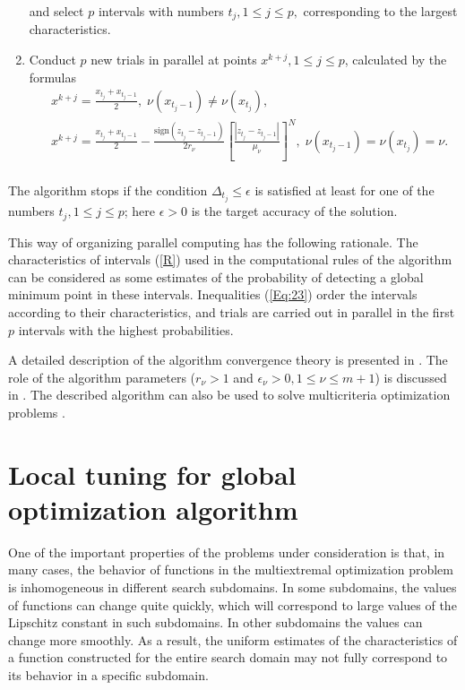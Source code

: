 \documentclass[
11pt,%
tightenlines,%
twoside,%
onecolumn,%
nofloats,%
nobibnotes,%
nofootinbib,%
superscriptaddress,%
noshowpacs,%
centertags]%
{revtex4}
\begin{document}
\begin{enumerate}
and select $p$ intervals with numbers $t_j, 1\leq j \leq p,$ corresponding to the largest characteristics.
\item
Conduct $p$ new trials in parallel at points $x^{k+j}, 1 \leq j \leq p$, calculated by the formulas
\begin{eqnarray*}
& x^{k+j}=\frac{x_{t_j}+x_{t_j-1}}{2}, \; \nu(x_{t_j-1})\neq \nu(x_{t_j}), \\
& x^{k+j}=\frac{x_{t_j}+x_{t_j-1}}{2}- \frac{\mathrm{sign}(z_{t_j}-z_{t_j-1})}{2r_\nu}\left[\frac{\left|z_{t_j}-z_{t_j-1}\right|}{\mu_\nu}\right]^N, \; \nu(x_{t_j-1})=\nu(x_{t_j})=\nu. \\
\end{eqnarray*} 

\end{enumerate}

The algorithm stops if the condition $\Delta_{t_j}\leq \epsilon$ is satisfied at least for one of the numbers $t_j, 1\leq j \leq p$; here $\epsilon>0$ is the target accuracy of the solution.

This way of organizing parallel computing has the following rationale. The characteristics of intervals (\ref{R}) used in the computational rules of the algorithm can be considered as some estimates of the probability of detecting a global minimum point in these intervals. Inequalities (\ref{Eq:23}) order the intervals according to their characteristics, and trials are carried out in parallel in the first $p$ intervals with the highest probabilities.

A detailed description of the algorithm convergence theory is presented in \cite{Strongin2000,Strongin2013}.
The role of the algorithm parameters ($r_\nu>1$ and $\epsilon_\nu>0, 1\leq\nu\leq m+1$) is discussed in \cite{Strongin2020}.
The described algorithm can also be used to solve multicriteria optimization problems \cite{Gergel2020}.

\section{Local tuning for global optimization algorithm}

One of the important properties of the problems under consideration is that, in many cases, the behavior of functions in the multiextremal optimization problem is inhomogeneous in different search subdomains. In some subdomains, the values of functions can change quite quickly, which will correspond to large values of the Lipschitz constant in such subdomains. In other subdomains the values can change more smoothly. As a result, the uniform estimates of the characteristics of a function constructed for the entire search domain may not fully correspond to its behavior in a specific subdomain. 
\end{document}
